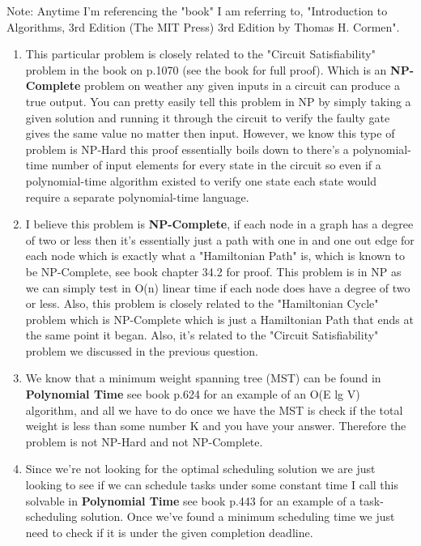 \documentclass{article}
\begin{document}
\begin{enumerate}
    Note: Anytime I'm referencing the "book" I am referring to, "Introduction to Algorithms, 3rd Edition (The MIT Press) 3rd Edition by Thomas H. Cormen".
 
    \begin{enumerate}
      \item This particular problem is closely related to the "Circuit Satisfiability" problem in the book on p.1070 (see the book for full proof). Which is an \textbf{NP-Complete} problem on weather any given inputs in a circuit can produce a true output.
      You can pretty easily tell this problem in NP by simply taking a given solution and running it through the circuit to verify the faulty gate gives the same value no matter then input. 
      However, we know this type of problem is NP-Hard this proof essentially boils down to there's a polynomial-time number of input elements for every state in the circuit so even if a polynomial-time algorithm existed to verify one state each state would require a separate polynomial-time language. 
      
      \item I believe this problem is \textbf{NP-Complete}, if each node in a graph has a degree of two or less then it's essentially just a path with one in and one out edge for each node which is exactly what a "Hamiltonian Path" is, which is known to be NP-Complete, see book chapter 34.2 for proof.
      This problem is in NP as we can simply test in O(n) linear time if each node does have a degree of two or less. Also, this problem is closely related to the "Hamiltonian Cycle" problem which is NP-Complete which is just a Hamiltonian Path that ends at the same point it began. 
      Also, it's related to the "Circuit Satisfiability" problem we discussed in the previous question.
    
      \item We know that a minimum weight spanning tree (MST) can be found in \textbf{Polynomial Time} see book p.624 for an example of an O(E lg V) algorithm, and all we have to do once we have the MST is check if the total weight is less than some number K and you have your answer. 
      Therefore the problem is not NP-Hard and not NP-Complete. 
    
      \item Since we're not looking for the optimal scheduling solution we are just looking to see if we can schedule tasks under some constant time I call this solvable in \textbf{Polynomial Time} see book p.443 for an example of a task-scheduling solution. 
      Once we've found a minimum scheduling time we just need to check if it is under the given completion deadline. 
    

\end{enumerate}
\end{enumerate}
\end{document}
